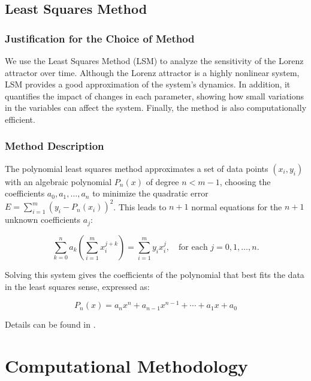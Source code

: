 \documentclass[12pt, a4paper]{article}
\begin{document}
	\subsection{Least Squares Method}
	\subsubsection{Justification for the Choice of Method}
	
	We use the Least Squares Method (LSM) to analyze the sensitivity of the Lorenz attractor over time. Although the Lorenz attractor is a highly nonlinear system, LSM provides a good approximation of the system’s dynamics. In addition, it quantifies the impact of changes in each parameter, showing how small variations in the variables can affect the system. Finally, the method is also computationally efficient.
	
	\subsubsection{Method Description}
	
	The polynomial least squares method approximates a set of data points $(x_i, y_i)$ with an algebraic polynomial $P_n(x)$ of degree $n < m - 1$, choosing the coefficients $a_0, a_1, \ldots, a_n$ to minimize the quadratic error $E = \sum_{i=1}^m (y_i - P_n(x_i))^2$. This leads to $n + 1$ normal equations for the $n + 1$ unknown coefficients $a_j$:
	
	\begin{equation}
		\sum_{k=0}^n a_k \left(\sum_{i=1}^m x_i^{j+k}\right) = \sum_{i=1}^m y_i x_i^j,
		\quad \text{for each } j = 0, 1, \ldots, n.
	\end{equation}
	
	Solving this system gives the coefficients of the polynomial that best fits the data in the least squares sense, expressed as:
	
	\begin{equation*}
		P_n(x) = a_nx^n + a_{n-1}x^{n-1} + \cdots + a_1x + a_0
	\end{equation*}
	
	Details can be found in \cite{burden2016}.
	\newpage
	
	    
	    
	\section{Computational Methodology}
	
\end{document}
